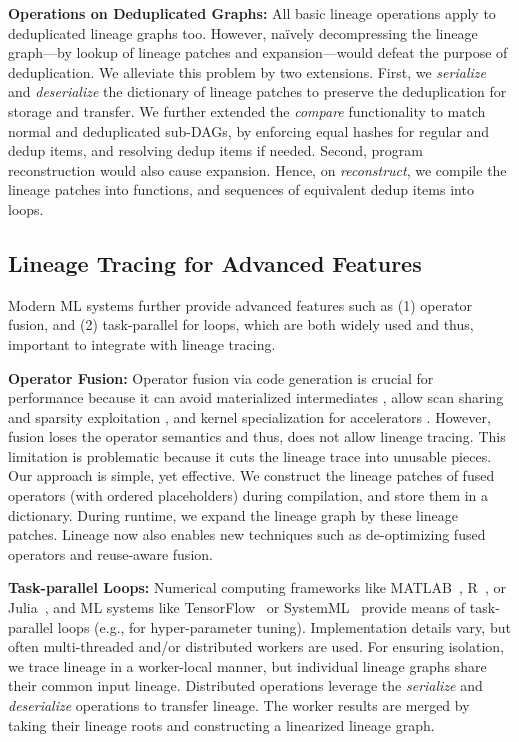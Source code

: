 \textbf{Operations on Deduplicated Graphs:} All basic lineage operations apply to deduplicated lineage graphs too. However, na\"ively decompressing the lineage graph---by lookup of lineage patches and expansion---would defeat the purpose of deduplication. We alleviate this problem by two extensions. First, we \emph{serialize} and \emph{deserialize} the dictionary of lineage patches to preserve the deduplication for storage and transfer. We further extended the \emph{compare} functionality to match normal and deduplicated sub-DAGs, by enforcing equal hashes for regular and dedup items, and resolving dedup items if needed. Second, program reconstruction would also cause expansion. Hence, on \emph{reconstruct}, we compile the lineage patches into functions, and sequences of equivalent dedup items into loops.

\subsection{Lineage Tracing for Advanced Features}
\label{sec:advanced}

Modern ML systems further provide advanced features such as (1) operator fusion, and (2) task-parallel for loops, which are both widely used and thus, important to integrate with lineage tracing.

\textbf{Operator Fusion:} Operator fusion via code generation is crucial for performance because it can avoid materialized intermediates \cite{CrottyGDKBCZ15,BoehmRHSEP18,PalkarTNTPNSSPA18}, allow scan sharing and sparsity exploitation \cite{BoehmRHSEP18,HuangB013}, and kernel specialization for accelerators \cite{ChenMJZYSCWHCGK18,XLA,AshariTBRCKS15}. However, fusion loses the operator semantics and thus, does not allow lineage tracing. This limitation is problematic because it cuts the lineage trace into unusable pieces. Our approach is simple, yet effective. We construct the lineage patches of fused operators (with ordered placeholders) during compilation, and store them in a dictionary. During runtime, we expand the lineage graph by these lineage patches. Lineage now also enables new techniques such as de-optimizing fused operators and reuse-aware fusion.
  
\textbf{Task-parallel Loops:} Numerical computing frameworks like MATLAB~\cite{SharmaM09}, R~\cite{Rdopar}, or Julia~\cite{BezansonEKS17}, and ML systems like TensorFlow~\cite{AbadiBCCDDDGIIK16} or SystemML~\cite{BoehmDEEMPRRSST16,BoehmTRSTBV14} provide means of task-parallel loops (e.g., for hyper-parameter tuning). Implementation details vary, but often multi-threaded and/or distributed workers are used. For ensuring isolation, we trace lineage in a worker-local manner, but individual lineage graphs share their common input lineage. Distributed operations leverage the \emph{serialize} and \emph{deserialize} operations to transfer lineage. The worker results are merged by taking their lineage roots and constructing a linearized lineage graph.

